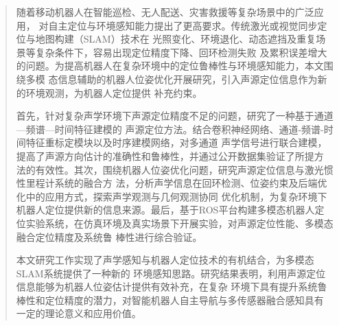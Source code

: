 

\begin{abstract}
随着移动机器人在智能巡检、无人配送、灾害救援等复杂场景中的广泛应用，
对自主定位与环境感知能力提出了更高要求。传统激光或视觉同步定位与地图构建（SLAM）技术在
光照变化、环境退化、动态遮挡及重复场景等复杂条件下，容易出现定位精度下降、回环检测失败
及累积误差增大的问题。为提高机器人在复杂环境中的定位鲁棒性与环境感知能力，本文围绕多模
态信息辅助的机器人位姿优化开展研究，引入声源定位信息作为新的环境观测，为机器人定位提供
补充约束。

首先，针对复杂声学环境下声源定位精度不足的问题，研究了一种基于通道—频谱—时间特征建模的
声源定位方法。结合卷积神经网络、通道-频谱-时间特征重标定模块以及时序建模网络，对多通道
声学信号进行联合建模，提高了声源方向估计的准确性和鲁棒性，并通过公开数据集验证了所提方
法的有效性。其次，围绕机器人位姿优化问题，研究声源定位信息与激光惯性里程计系统的融合方
法，分析声学信息在回环检测、位姿约束及后端优化中的应用方式，探索声学观测与几何观测协同
优化机制，为复杂环境下机器人定位提供新的信息来源。最后，基于ROS平台构建多模态机器人定
位实验系统，在仿真环境及真实场景下开展实验，对声源定位性能、多模态融合定位精度及系统鲁
棒性进行综合验证。

本文研究工作实现了声学感知与机器人定位技术的有机结合，为多模态SLAM系统提供了一种新的
环境感知思路。研究结果表明，利用声源定位信息能够为机器人位姿估计提供有效补充，在复杂
环境下具有提升系统鲁棒性和定位精度的潜力，对智能机器人自主导航与多传感器融合感知具有
一定的理论意义和应用价值。
\end{abstract}

